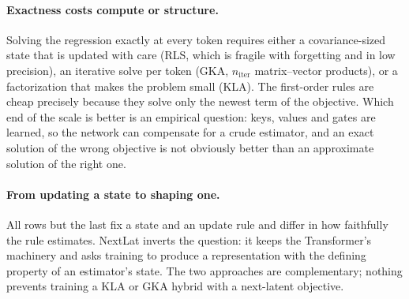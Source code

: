 \paragraph{Exactness costs compute or structure.} Solving the regression exactly at every token
requires either a covariance-sized state that is updated with care (RLS, which is fragile with
forgetting and in low precision), an iterative solve per token (GKA, $n_\text{iter}$ matrix--vector
products), or a factorization that makes the problem small (KLA). The first-order rules are cheap
precisely because they solve only the newest term of the objective. Which end of the scale is better
is an empirical question: keys, values and gates are learned, so the network can compensate for a
crude estimator, and an exact solution of the wrong objective is not obviously better than an
approximate solution of the right one.

\paragraph{From updating a state to shaping one.} All rows but the last fix a state and an update
rule and differ in how faithfully the rule estimates. NextLat inverts the question: it keeps the
Transformer's machinery and asks training to produce a representation with the defining property of
an estimator's state. The two approaches are complementary; nothing prevents training a KLA or GKA
hybrid with a next-latent objective.

